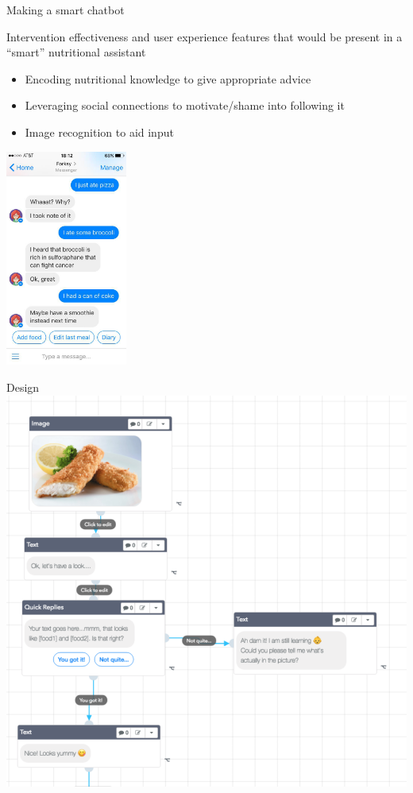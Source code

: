 \documentclass[landscape]{infslides}
\begin{document}
\begin{slide}{Making a smart chatbot}
    \begin{multicols}{2}
        Intervention effectiveness and user experience features that would be present in a ``smart'' nutritional assistant
        \begin{itemize} 
            \item Encoding nutritional knowledge to give appropriate advice
            \item Leveraging social connections to motivate/shame into following it
            \item Image recognition to aid input
        \end{itemize} 
        \includegraphics[width=0.3\textwidth, right]{Forksy.jpg}
    \end{multicols}
\end{slide}
\begin{slide}{Design}
    \centering
    \includegraphics[height=0.85\textheight]{Botmock.png}
\end{slide}
\end{document}
